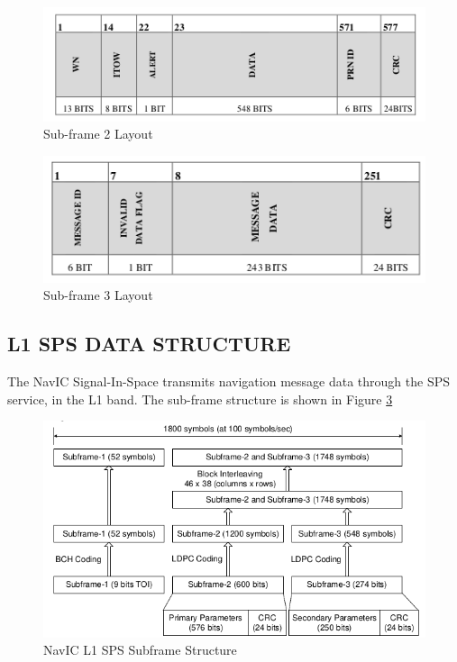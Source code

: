\begin{figure}[ht]
\centering
\includegraphics[width=0.8\columnwidth]{figs/subframe2.png}
\centering
\captionsetup{justification=centering}
\caption{Sub-frame 2 Layout}
\label{fig:subframe2}
\end{figure}

\begin{figure}[ht]
\centering
\includegraphics[width=0.8\columnwidth]{figs/subframe3.png}
\centering
\captionsetup{justification=centering}
\caption{Sub-frame 3 Layout}
\label{fig:subframe3}
\end{figure}
\subsection{L1 SPS DATA STRUCTURE}
The NavIC Signal-In-Space transmits navigation message data through the SPS service, in the L1 band. The sub-frame structure is shown in Figure \ref{fig: SPS_Structure}
\begin{figure}[ht]
\centering
\includegraphics[width=0.8\columnwidth]{figs/SPS_Structure.png}
\centering
\captionsetup{justification=centering}
\caption{NavIC L1 SPS Subframe Structure}
\label{fig: SPS_Structure}
\end{figure}

